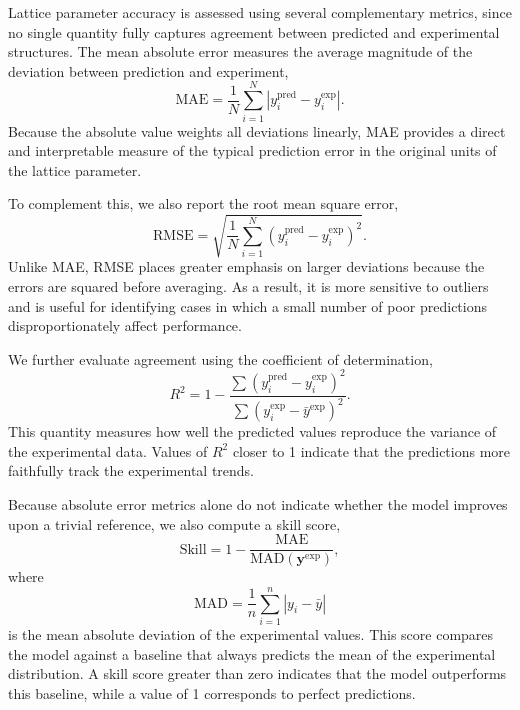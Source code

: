 \documentclass[pdflatex,sn-mathphys-num]{sn-jnl}
\theoremstyle{thmstyleone}
\theoremstyle{thmstyletwo}
\theoremstyle{thmstylethree}
\begin{document}
Lattice parameter accuracy is assessed using several complementary metrics, since no single quantity fully captures agreement between predicted and experimental structures. The mean absolute error measures the average magnitude of the deviation between prediction and experiment,
\begin{equation}
\mathrm{MAE} = \frac{1}{N}\sum_{i=1}^{N}\left|y_i^{\mathrm{pred}} - y_i^{\mathrm{exp}}\right|.
\end{equation}
Because the absolute value weights all deviations linearly, MAE provides a direct and interpretable measure of the typical prediction error in the original units of the lattice parameter.

To complement this, we also report the root mean square error,
\begin{equation}
\mathrm{RMSE} = \sqrt{\frac{1}{N}\sum_{i=1}^{N}\left(y_i^{\mathrm{pred}} - y_i^{\mathrm{exp}}\right)^2}.
\end{equation}
Unlike MAE, RMSE places greater emphasis on larger deviations because the errors are squared before averaging. As a result, it is more sensitive to outliers and is useful for identifying cases in which a small number of poor predictions disproportionately affect performance.

We further evaluate agreement using the coefficient of determination,
\begin{equation}
R^2 = 1 - \frac{\sum\left(y_i^{\mathrm{pred}} - y_i^{\mathrm{exp}}\right)^2}
                 {\sum\left(y_i^{\mathrm{exp}} - \bar{y}^{\mathrm{exp}}\right)^2}.
\end{equation}
This quantity measures how well the predicted values reproduce the variance of the experimental data. Values of $R^2$ closer to 1 indicate that the predictions more faithfully track the experimental trends.

Because absolute error metrics alone do not indicate whether the model improves upon a trivial reference, we also compute a skill score,
\begin{equation}
\mathrm{Skill} = 1 - \frac{\mathrm{MAE}}{\mathrm{MAD}(\mathbf{y}^{\mathrm{exp}})},
\end{equation}
where
\begin{equation}
\mathrm{MAD} = \frac{1}{n}\sum_{i=1}^{n} \left| y_i - \bar{y} \right|
\end{equation}
is the mean absolute deviation of the experimental values. This score compares the model against a baseline that always predicts the mean of the experimental distribution. A skill score greater than zero indicates that the model outperforms this baseline, while a value of 1 corresponds to perfect predictions.
\end{document}
